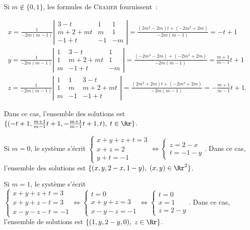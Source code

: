 {{\begin{enumerate}
Si $m\notin\{0,1\}$, les formules de \textsc{Cramer} fournissent~:

$$\begin{array}{l}
x=\frac{1}{-2m(m-1)}\left|
\begin{array}{ccc}
3-t&1&1\\
m+2+mt&m&1\\
-1+t&-1&-m
\end{array}\right|=\frac{(2m^2-2m)t+(-2m^2+2m)}{-2m(m-1)}=-t+1\\
y=\frac{1}{-2m(m-1)}\left|
\begin{array}{ccc}
1&3-t&1\\
1&m+2+mt&1\\
m&-1+t&-m
\end{array}\right|=\frac{(-2m^2-2m)+(-2m^2+2m)}{-2m(m-1)}=\frac{m+1}{m-1}t+1\\
z=\frac{1}{-2m(m-1)}\left|
\begin{array}{ccc}
1&1&3-t\\
1&m&m+2+mt\\
m&-1&-1+t
\end{array}\right|=\frac{(2m^2+2m)t+(-2m^2+2m)}{-2m(m-1)}=-\frac{m+1}{m-1}t+1.
\end{array}$$

Dans ce cas, l'ensemble des solutions est $\{(-t+1,\frac{m+1}{m-1}t+1,-\frac{m+1}{m-1}t+1,t),\;t\in\Rr\}$.

Si $m=0$, le système s'écrit $\left\{
\begin{array}{l}
x+y+z+t=3\\
x+z=2\\
y+t=-1
\end{array}
\right.\Leftrightarrow \left\{
\begin{array}{l}
z=2-x\\
t=-1-y
\end{array}
\right.$. Dans ce cas, l'ensemble des solutions est $\{(x,y,2-x,1-y),\;(x,y)\in\Rr^2\}$.

Si $m=1$, le système s'écrit $\left\{
\begin{array}{l}
x+y+z+t=3\\
x+y+z-t=3\\
x-y-z-t=-1
\end{array}\right.\Leftrightarrow\left\{
\begin{array}{l}
t=0\\
x+y+z=3\\
x-y-z=-1
\end{array}\right.\Leftrightarrow\left\{
\begin{array}{l}
t=0\\
x=1\\
z=2-y
\end{array}\right.$. Dans ce cas, l'ensemble de solutions est $\{(1,y,2-y,0),\;z\in\Rr\}$.


\end{enumerate}}}
